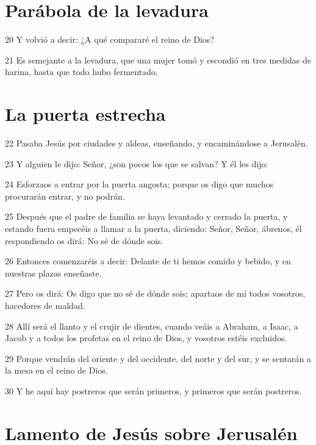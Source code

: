 \section*{Parábola de la levadura}

\par 20 Y volvió a decir: ¿A qué compararé el reino de Dios?
\par 21 Es semejante a la levadura, que una mujer tomó y escondió en tres medidas de harina, hasta que todo hubo fermentado.

\section*{La puerta estrecha}

\par 22 Pasaba Jesús por ciudades y aldeas, enseñando, y encaminándose a Jerusalén.
\par 23 Y alguien le dijo: Señor, ¿son pocos los que se salvan? Y él les dijo:
\par 24 Esforzaos a entrar por la puerta angosta; porque os digo que muchos procurarán entrar, y no podrán.
\par 25 Después que el padre de familia se haya levantado y cerrado la puerta, y estando fuera empecéis a llamar a la puerta, diciendo: Señor, Señor, ábrenos, él respondiendo os dirá: No sé de dónde sois.
\par 26 Entonces comenzaréis a decir: Delante de ti hemos comido y bebido, y en nuestras plazas enseñaste.
\par 27 Pero os dirá: Os digo que no sé de dónde sois; apartaos de mí todos vosotros, hacedores de maldad.
\par 28 Allí será el llanto y el crujir de dientes, cuando veáis a Abraham, a Isaac, a Jacob y a todos los profetas en el reino de Dios, y vosotros estéis excluidos.
\par 29 Porque vendrán del oriente y del occidente, del norte y del sur, y se sentarán a la mesa en el reino de Dios.
\par 30 Y he aquí hay postreros que serán primeros, y primeros que serán postreros.

\section*{Lamento de Jesús sobre Jerusalén}

